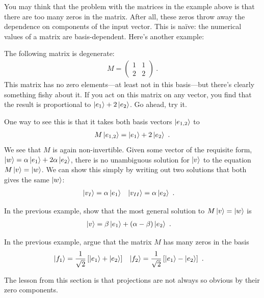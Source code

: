 \documentclass[12pt, oneside]{report}    %
\begin{document}
You may think that the problem with the matrices in the example above is that there are too many zeros in the matrix. After all, these zeros throw away the dependence on components of the input vector. This is na\"ive: the numerical values of a matrix are basis-dependent. Here's another example:
% 
\begin{example}
The following matrix is degenerate:
\begin{align}
    M = 
    \begin{pmatrix}
        1 & 1 \\
        2 & 2
    \end{pmatrix} \ .
\end{align}
This matrix has no zero elements---at least not in this basis---but there's clearly something fishy about it. If you act on this matrix on any vector, you find that the result is proportional to $\left|e_1\right\rangle + 2 \left|e_2\right\rangle$. Go ahead, try it. 

One way to see this is that it takes both basis vectors $\left|e_{1,2}\right\rangle$ to
\begin{align}
    M\left|e_{1,2}\right\rangle = \left|e_1\right\rangle + 2 \left|e_2\right\rangle \ .
\end{align}
We see that $M$ is again non-invertible. Given some vector of the requisite form, $\left|w\right\rangle = \alpha \left|e_1\right\rangle + 2\alpha \left|e_2\right\rangle$, there is no unambiguous solution for $\left|v\right\rangle$ to the equation $M\left|v\right\rangle = \left|w\right\rangle$. We can show this simply by writing out two solutions that both gives the same $\left|w\right\rangle$:
\begin{align}
    \left|v_I\right\rangle &= \alpha \left|e_1\right\rangle
    &
    \left|v_{II}\right\rangle &= \alpha \left|e_2\right\rangle \ .
\end{align}
\end{example}
\begin{exercise}
In the previous example, show that the most general solution to $M\left|v\right\rangle = \left|w\right\rangle$ is
\begin{align}
    \left|v\right\rangle &= \beta\left|e_1\right\rangle + (\alpha-\beta)\left|e_2\right\rangle \ .
\end{align}
\end{exercise}
\begin{exercise}
In the previous example, argue that the matrix $M$ has many zeros in the basis
\begin{align}
    \left|f_1\right\rangle&= \frac{1}{\sqrt{2}}
    \left[\left|e_1\right\rangle+\left|e_2\right\rangle\right]
    &
    \left|f_2\right\rangle&= \frac{1}{\sqrt{2}}
    \left[\left|e_1\right\rangle-\left|e_2\right\rangle\right] \ .
\end{align}
\end{exercise}
The lesson from this section is that projections are not always so obvious by their zero components. 
\end{document}
